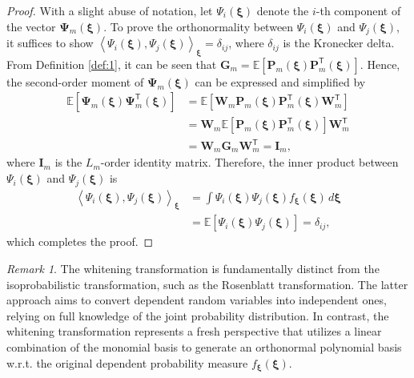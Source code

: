 \documentclass[journal]{IEEEtran}
\theoremstyle{definition}
\theoremstyle{remark}
\newtheorem{remark}{Remark}
\begin{document}
\begin{proof}
With a slight abuse of notation, let $\Psi_i(\boldsymbol{\xi})$ denote the $i$-th component of the vector $\boldsymbol{\Psi}_m(\boldsymbol{\xi})$. To prove the orthonormality between $\Psi_i(\boldsymbol{\xi})$ and $\Psi_j(\boldsymbol{\xi})$, it suffices to show $\left\langle \Psi_i(\boldsymbol{\xi}), \Psi_j(\boldsymbol{\xi}) \right\rangle_{\boldsymbol{\xi}}=\delta_{ij}$, where $\delta_{ij}$ is the Kronecker delta. 
From Definition \ref{def:1}, it can be seen that $\boldsymbol{G}_m=\mathbb{E}\left[\boldsymbol{P}_m(\boldsymbol{\xi})\boldsymbol{P}_m^{\mathsf{T}}(\boldsymbol{\xi})\right]$. Hence, the second-order moment of $\boldsymbol{\Psi}_m(\boldsymbol{\xi})$ can be expressed and simplified by
\begin{equation}\label{eq:14}
\begin{split}
    \mathbb{E}\left[\boldsymbol{\Psi}_m(\boldsymbol{\xi})\boldsymbol{\Psi}_m^{\mathsf{T}}(\boldsymbol{\xi})\right]
    & = \mathbb{E}\left[\boldsymbol{W}_m\boldsymbol{P}_m(\boldsymbol{\xi})\boldsymbol{P}_m^{\mathsf{T}}(\boldsymbol{\xi})\boldsymbol{W}_m^{\mathsf{T}}\right] \\
    & = \boldsymbol{W}_m\mathbb{E}\left[\boldsymbol{P}_m(\boldsymbol{\xi})\boldsymbol{P}_m^{\mathsf{T}}(\boldsymbol{\xi})\right]\boldsymbol{W}_m^{\mathsf{T}} \\
    & = \boldsymbol{W}_m\boldsymbol{G}_m\boldsymbol{W}_m^{\mathsf{T}} = \boldsymbol{I}_m,
    \end{split}
\end{equation}
where $\boldsymbol{I}_m$ is the $L_{m}$-order identity matrix. Therefore, the inner product between $\Psi_i(\boldsymbol{\xi})$ and $\Psi_j(\boldsymbol{\xi})$ is
\begin{equation}
\begin{split}
        \left\langle \Psi_i(\boldsymbol{\xi}), \Psi_j(\boldsymbol{\xi}) \right\rangle_{\boldsymbol{\xi}}& = \int \Psi_i(\boldsymbol{\xi})\Psi_j(\boldsymbol{\xi})f_{\boldsymbol{\xi}}(\boldsymbol{\xi}) \, d\boldsymbol{\xi}\\
        & = \mathbb{E}\left[\Psi_i(\boldsymbol{\xi})\Psi_j(\boldsymbol{\xi})\right]=\delta_{ij},
\end{split}
\end{equation}
which completes the proof.
\end{proof}\vspace{-8pt}
\begin{remark}
The whitening transformation is fundamentally distinct from the isoprobabilistic transformation, such as the Rosenblatt transformation. The latter approach aims to convert dependent random variables into independent ones, relying on full knowledge of the joint probability distribution. In contrast, the whitening transformation represents a fresh perspective that utilizes a linear combination of the monomial basis to generate an orthonormal polynomial basis w.r.t. the original dependent probability measure $f_{\boldsymbol{\xi}}(\boldsymbol{\xi})$.
\end{remark}
\end{document}
